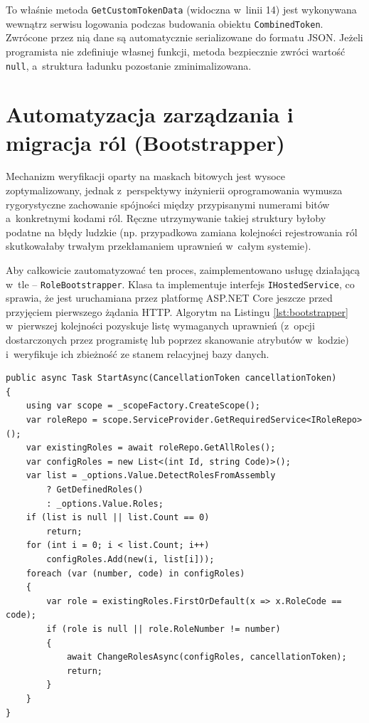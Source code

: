 \documentclass{SGGW-thesis}
\begin{document}
To właśnie metoda \texttt{GetCustomTokenData} (widoczna w~linii 14) jest wykonywana wewnątrz serwisu logowania podczas budowania obiektu \texttt{CombinedToken}. Zwrócone przez nią dane są automatycznie serializowane do formatu JSON. Jeżeli programista nie zdefiniuje własnej funkcji, metoda bezpiecznie zwróci wartość \texttt{null}, a~struktura ładunku pozostanie zminimalizowana.

\section{Automatyzacja zarządzania i migracja ról (Bootstrapper)}

Mechanizm weryfikacji oparty na maskach bitowych jest wysoce zoptymalizowany, jednak z~perspektywy inżynierii oprogramowania wymusza rygorystyczne zachowanie spójności między przypisanymi numerami bitów a~konkretnymi kodami ról. Ręczne utrzymywanie takiej struktury byłoby podatne na błędy ludzkie (np. przypadkowa zamiana kolejności rejestrowania ról skutkowałaby trwałym przekłamaniem uprawnień w~całym systemie). 

Aby całkowicie zautomatyzować ten proces, zaimplementowano usługę działającą w~tle – \texttt{RoleBootstrapper}. Klasa ta implementuje interfejs \texttt{IHostedService}, co sprawia, że jest uruchamiana przez platformę ASP.NET Core jeszcze przed przyjęciem pierwszego żądania HTTP. Algorytm na Listingu \ref{lst:bootstrapper} w~pierwszej kolejności pozyskuje listę wymaganych uprawnień (z~opcji dostarczonych przez programistę lub poprzez skanowanie atrybutów w~kodzie) i~weryfikuje ich zbieżność ze stanem relacyjnej bazy danych.

\begin{lstlisting}[caption={Mechanizm rozruchowy weryfikujący zgodność masek bitowych}, label={lst:bootstrapper}]  
public async Task StartAsync(CancellationToken cancellationToken)
{
    using var scope = _scopeFactory.CreateScope();
    var roleRepo = scope.ServiceProvider.GetRequiredService<IRoleRepo>();
    var existingRoles = await roleRepo.GetAllRoles();
    var configRoles = new List<(int Id, string Code)>();
    var list = _options.Value.DetectRolesFromAssembly
        ? GetDefinedRoles()
        : _options.Value.Roles;
    if (list is null || list.Count == 0)
        return;
    for (int i = 0; i < list.Count; i++)
        configRoles.Add(new(i, list[i]));
    foreach (var (number, code) in configRoles)
    {
        var role = existingRoles.FirstOrDefault(x => x.RoleCode == code);
        if (role is null || role.RoleNumber != number)
        {
            await ChangeRolesAsync(configRoles, cancellationToken);
            return;
        }
    }
}
\end{lstlisting}
\end{document}
